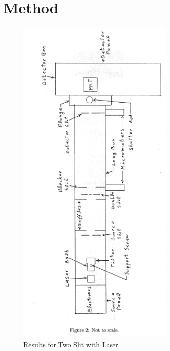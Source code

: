 \documentclass[12pt,twocolumn]{article}
\begin{document}
\section{Method}
\begin{figure}[h!]
	\centering
	\label{fig:setup}
	\includegraphics[width=3in]{images/Labphoto1}
	\caption{Results for Two Slit with Laser}
\end{figure}
\end{document}

